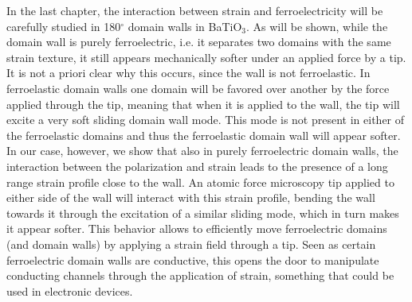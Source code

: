 In the last chapter, the interaction between strain and ferroelectricity will be carefully studied in 180$^\circ$ domain walls in BaTiO$_3$.
As will be shown, while the domain wall is purely ferroelectric, i.e. it separates two domains with the same strain texture, it still appears mechanically softer under an applied force by a tip.
It is not a priori clear why this occurs, since the wall is not ferroelastic.
In ferroelastic domain walls one domain will be favored over another by the force applied through the tip, meaning that when it is applied to the wall, the tip will excite a very soft sliding domain wall mode.
This mode is not present in either of the ferroelastic domains and thus the ferroelastic domain wall will appear softer.
In our case, however, we show that also in purely ferroelectric domain walls, the interaction between the polarization and strain leads to the presence of a long range strain profile close to the wall.
An atomic force microscopy tip applied to either side of the wall will interact with this strain profile, bending the wall towards it through the excitation of a similar sliding mode, which in turn makes it appear softer.
This behavior allows to efficiently move ferroelectric domains (and domain walls) by applying a strain field through a tip.
Seen as certain ferroelectric domain walls are conductive, this opens the door to manipulate conducting channels through the application of strain, something that could be used in electronic devices.

